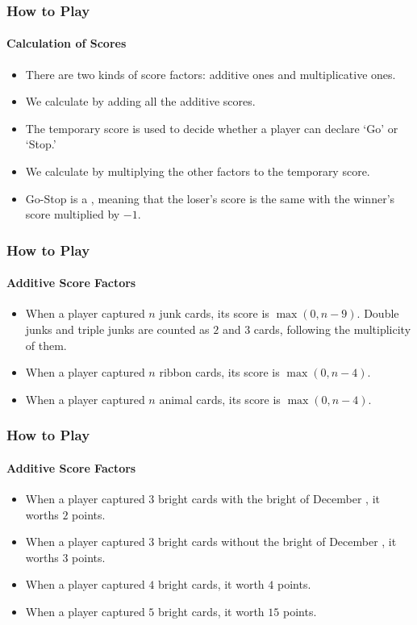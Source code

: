 \begin{frame}[fragile]
  \frametitle{How to Play}
  \framesubtitle{Calculation of Scores}

  \begin{itemize}
    \item There are two kinds of score factors: additive ones and multiplicative ones.
    \item We calculate  by adding all the additive scores.
    \item The temporary score is used to decide whether a player can declare `Go' or `Stop.'
    \item We calculate  by multiplying the other factors to the temporary score.
    \item Go-Stop is a , meaning that the loser's score is the same with the winner's score multiplied by $-1$. 
  \end{itemize}
\end{frame}

\begin{frame}[fragile]
  \frametitle{How to Play}
  \framesubtitle{Additive Score Factors}

  \begin{itemize}
    \item When a player captured $n$ junk cards, its score is $\max(0, n - 9)$. Double junks and triple junks are counted as $2$ and $3$ cards, following the multiplicity of them.
    \item When a player captured $n$ ribbon cards, its score is $\max(0, n - 4)$.
    \item When a player captured $n$ animal cards, its score is $\max(0, n - 4)$.
  \end{itemize}
\end{frame}

\begin{frame}[fragile]
  \frametitle{How to Play}
  \framesubtitle{Additive Score Factors}

  \begin{itemize}
    \item When a player captured $3$ bright cards with the bright of December , it worths $2$ points.
    \item When a player captured $3$ bright cards without the bright of December , it worths $3$ points.
    \item When a player captured $4$ bright cards, it worth $4$ points.
    \item When a player captured $5$ bright cards, it worth $15$ points.
  \end{itemize}
\end{frame}

